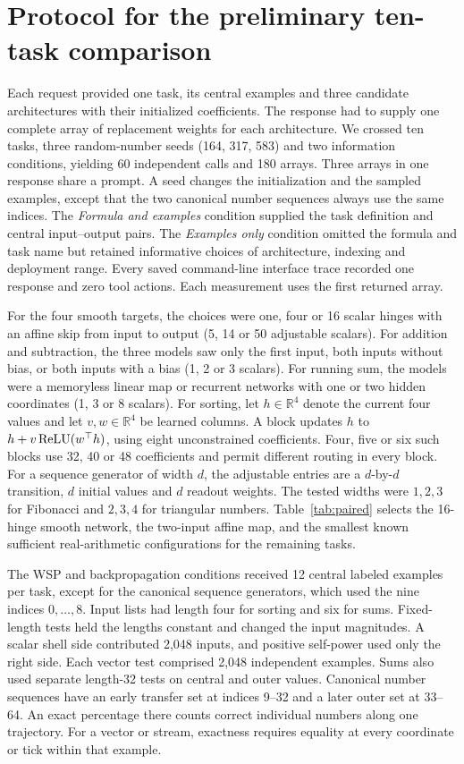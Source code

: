\section{Protocol for the preliminary ten-task comparison}\label{app:matched}
Each request provided one task, its central examples and three candidate architectures with their initialized coefficients. The response had to supply one complete array of replacement weights for each architecture. We crossed ten tasks, three random-number seeds (164, 317, 583) and two information conditions, yielding 60 independent calls and 180 arrays. Three arrays in one response share a prompt. A seed changes the initialization and the sampled examples, except that the two canonical number sequences always use the same indices. The \emph{Formula and examples} condition supplied the task definition and central input--output pairs. The \emph{Examples only} condition omitted the formula and task name but retained informative choices of architecture, indexing and deployment range. Every saved command-line interface trace recorded one response and zero tool actions. Each measurement uses the first returned array.

For the four smooth targets, the choices were one, four or 16 scalar hinges with an affine skip from input to output (5, 14 or 50 adjustable scalars). For addition and subtraction, the three models saw only the first input, both inputs without bias, or both inputs with a bias (1, 2 or 3 scalars). For running sum, the models were a memoryless linear map or recurrent networks with one or two hidden coordinates (1, 3 or 8 scalars). For sorting, let \(h\in\mathbb R^4\) denote the current four values and let \(v,w\in\mathbb R^4\) be learned columns. A block updates \(h\) to \(h+v\operatorname{ReLU}(w^\top h)\), using eight unconstrained coefficients. Four, five or six such blocks use 32, 40 or 48 coefficients and permit different routing in every block. For a sequence generator of width \(d\), the adjustable entries are a \(d\)-by-\(d\) transition, \(d\) initial values and \(d\) readout weights. The tested widths were \(1,2,3\) for Fibonacci and \(2,3,4\) for triangular numbers. Table~\ref{tab:paired} selects the 16-hinge smooth network, the two-input affine map, and the smallest known sufficient real-arithmetic configurations for the remaining tasks.

The WSP and backpropagation conditions received 12 central labeled examples per task, except for the canonical sequence generators, which used the nine indices \(0,\ldots,8\). Input lists had length four for sorting and six for sums. Fixed-length tests held the lengths constant and changed the input magnitudes. A scalar shell side contributed 2,048 inputs, and positive self-power used only the right side. Each vector test comprised 2,048 independent examples. Sums also used separate length-32 tests on central and outer values. Canonical number sequences have an early transfer set at indices 9--32 and a later outer set at 33--64. An exact percentage there counts correct individual numbers along one trajectory. For a vector or stream, exactness requires equality at every coordinate or tick within that example.


